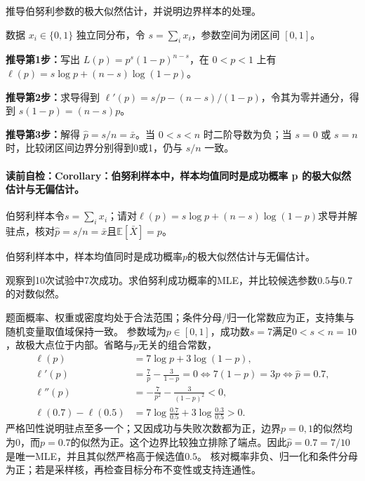 \begin{derivationgoalbox}
推导伯努利参数的极大似然估计，并说明边界样本的处理。
\end{derivationgoalbox}
\begin{derivationprepbox}
数据 $x_i\in\{0,1\}$ 独立同分布，令 $s=\sum_ix_i$，参数空间为闭区间 $[0,1]$。
\end{derivationprepbox}
\textbf{推导第1步：}写出 $L(p)=p^s(1-p)^{n-s}$，在 $0<p<1$ 上有 $\ell(p)=s\log p+(n-s)\log(1-p)$。

\textbf{推导第2步：}求导得到 $\ell'(p)=s/p-(n-s)/(1-p)$，令其为零并通分，得到 $s(1-p)=(n-s)p$。

\textbf{推导第3步：}解得 $\hat p=s/n=\bar x$。当 $0<s<n$ 时二阶导数为负；当 $s=0$ 或 $s=n$ 时，比较闭区间边界分别得到0或1，仍与 $s/n$ 一致。

\label{struct:V1-C05-CH14}
\paragraph{读前自检：Corollary：伯努利样本中，样本均值同时是成功概率 p 的极大似然估计与无偏估计。}伯努利样本令$s=\sum_i x_i$；请对$\ell(p)=s\log p+(n-s)\log(1-p)$求导并解驻点，核对$\widehat p=s/n=\bar x$且$\mathbb E[\bar X]=p$。\par

\begin{corollary}
伯努利样本中，样本均值同时是成功概率$p$的极大似然估计与无偏估计。
\end{corollary}

\label{struct:V1-C05-CH20}
\begin{example}[十次伯努利试验的极大似然]\label{exm:V1-C05-binomial-mle}
观察到10次试验中7次成功。求伯努利成功概率的MLE，并比较候选参数$0.5$与$0.7$的对数似然。
\end{example}
\begin{solution}
\SolGiven 题面概率、权重或密度均处于合法范围；条件分母/归一化常数应为正，支持集与随机变量取值域保持一致。
\SolDerive
参数域为$p\in[0,1]$，成功数$s=7$满足$0<s<n=10$，故极大点位于内部。省略与$p$无关的组合常数，
\[
\begin{aligned}
\ell(p)&=7\log p+3\log(1-p),\\
\ell'(p)&=\frac7p-\frac3{1-p}=0
\Longleftrightarrow 7(1-p)=3p
\Longleftrightarrow \widehat p=0.7,\\
\ell''(p)&=-\frac7{p^2}-\frac3{(1-p)^2}<0,\\
\ell(0.7)-\ell(0.5)
&=7\log\frac{0.7}{0.5}+3\log\frac{0.3}{0.5}>0.
\end{aligned}
\]
严格凹性说明驻点至多一个；又因成功与失败次数都为正，边界$p=0,1$的似然均为0，而$p=0.7$的似然为正。这个边界比较独立排除了端点。因此$\widehat p=0.7=7/10$是唯一MLE，并且其似然严格高于候选值$0.5$。
\SolCheck 核对概率非负、归一化和条件分母为正；若是采样核，再检查目标分布不变性或支持连通性。
\end{solution}


